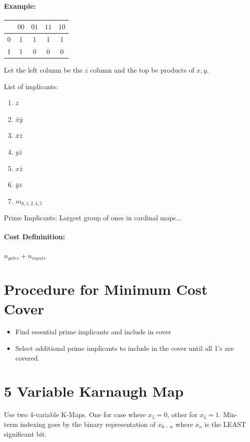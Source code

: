 \documentclass[a4paper,12pt]{report}
\begin{document}
\paragraph{Example: }
\begin{tabular}{l|cccc}
& $00$ & $01$ & $11$ & $10$   \\
\hline
0 & 1 & 1 & 1 & 1 \\
1 & 1 & 0 & 0 & 0 \\
\end{tabular}

Let the left column be the $z$ column and the top be products of $x, y$. 

List of implicants:
\begin{enumerate}
\item $\bar{z}$ 
\item $\bar{x} \bar{y}$
\item $\bar{x} \bar{z}$
\item $y\bar{z}$
\item $x\bar{z}$
\item $\bar{y}\bar{z}$
\item $m_{0, 1, 2, 4, 5}$
\end{enumerate}

Prime Implicants: Largest group of ones in cardinal maps...

\paragraph{Cost Defininition: } $n_{gates} + n_{inputs}$

\section{Procedure for Minimum Cost Cover}
\begin{itemize}
\item Find essential prime implicants and include in cover
\item Select additional prime implicants to include in the cover until all 1's are covered.
\end{itemize}

\section{5 Variable Karnaugh Map}
Use two 4-variable K-Maps. One for case where $x_5 = 0$, other for $x_5 = 1$.
Min-term indexing goes by the binary representation of $x_{0-n}$ where $x_n$ is the LEAST significant bit.
\end{document}
